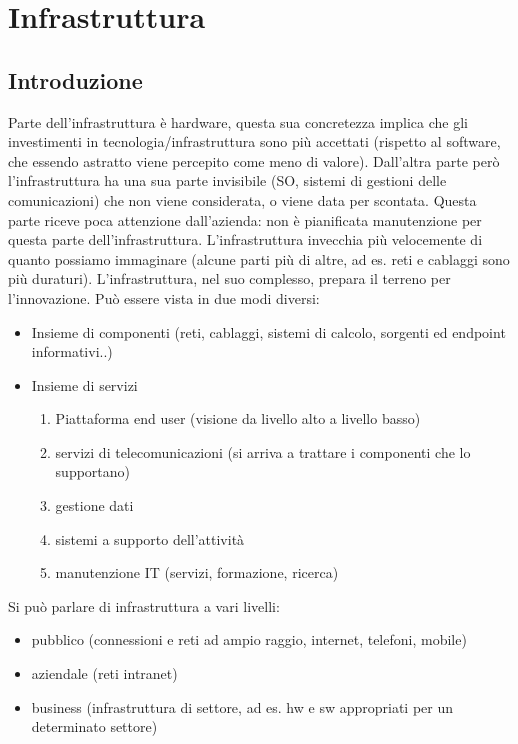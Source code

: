 \chapter{Infrastruttura}
\section{Introduzione}
Parte dell'infrastruttura \`e hardware, questa sua concretezza implica che gli investimenti in tecnologia/infrastruttura sono pi\`u accettati (rispetto al software, che essendo astratto viene percepito come meno di valore).
Dall'altra parte per\`o l'infrastruttura ha una sua parte invisibile (SO, sistemi di gestioni delle comunicazioni) che non viene considerata, o viene data per scontata. Questa parte riceve poca attenzione dall'azienda: non \`e pianificata manutenzione per questa parte dell'infrastruttura.
L'infrastruttura invecchia pi\`u velocemente di quanto possiamo immaginare (alcune parti pi\`u di altre, ad es. reti e cablaggi sono pi\`u duraturi).
L'infrastruttura, nel suo complesso, prepara il terreno per l'innovazione.
Pu\`o essere vista in due modi diversi:
\begin{itemize}
\item Insieme di componenti (reti, cablaggi, sistemi di calcolo, sorgenti ed endpoint informativi..)
\item Insieme di servizi
\begin{enumerate}
\item Piattaforma end user (visione da livello alto a livello basso)
\item servizi di telecomunicazioni (si arriva a trattare i componenti che lo supportano)
\item gestione dati
\item sistemi a supporto dell'attivit\`a
\item manutenzione IT (servizi, formazione, ricerca)

\end{enumerate}

\end{itemize}

Si pu\`o parlare di infrastruttura a vari livelli:
\begin{itemize}
\item pubblico (connessioni e reti ad ampio raggio, internet, telefoni, mobile)
\item aziendale (reti intranet)
\item business (infrastruttura di settore, ad es. hw e sw appropriati per un determinato settore)
\end{itemize}


